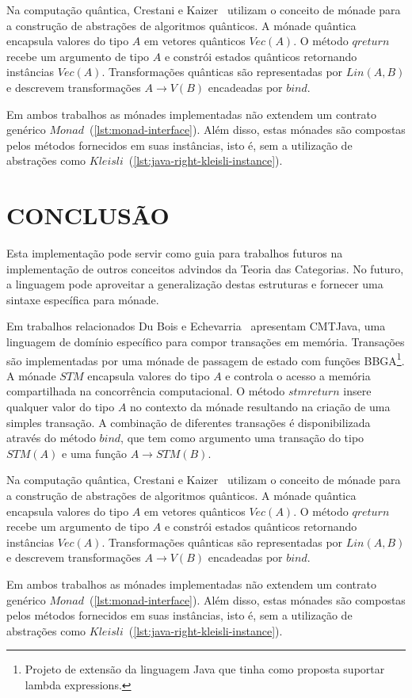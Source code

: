 \documentclass[10pt, conference]{IEEEtran}
\begin{document}
Na computação quântica, Crestani e Kaizer~\cite{crestani2013quantum} utilizam o conceito de mónade para a construção de abstrações de algoritmos quânticos. A mónade quântica encapsula valores do tipo $A$ em vetores quânticos $Vec(A)$. O método $qreturn$ recebe um argumento de tipo $A$ e constrói estados quânticos retornando instâncias $Vec(A)$. Transformações quânticas são representadas por $Lin(A, B)$ e descrevem transformações $A \rightarrow V(B)$ encadeadas por $bind$.

Em ambos trabalhos as mónades implementadas não extendem um contrato genérico $Monad$~(\ref{lst:monad-interface}). Além disso, estas mónades são compostas pelos métodos fornecidos em suas instâncias, isto é, sem a utilização de abstrações como $Kleisli$~(\ref{lst:java-right-kleisli-instance}).

\section{CONCLUSÃO}

Esta implementação pode servir como guia para trabalhos futuros na implementação de outros conceitos advindos da Teoria das Categorias. No futuro, a linguagem pode aproveitar a generalização destas estruturas e fornecer uma sintaxe específica para mónade.

Em trabalhos relacionados Du Bois e Echevarria~\cite{dubois2009domainspecific} apresentam CMTJava, uma linguagem de domínio específico para compor transações em memória. Transações são implementadas por uma mónade de passagem de estado com funções BBGA\footnote{Projeto de extensão da linguagem Java que tinha como proposta suportar lambda expressions.}. A mónade $STM$ encapsula valores do tipo $A$ e controla o acesso a memória compartilhada na concorrência computacional. O método $stmreturn$ insere qualquer valor do tipo $A$ no contexto da mónade resultando na criação de uma simples transação. A combinação de diferentes transações é disponibilizada através do método $bind$, que tem como argumento uma transação do tipo $STM(A)$ e uma função $A \rightarrow STM(B)$.

Na computação quântica, Crestani e Kaizer~\cite{crestani2013quantum} utilizam o conceito de mónade para a construção de abstrações de algoritmos quânticos. A mónade quântica encapsula valores do tipo $A$ em vetores quânticos $Vec(A)$. O método $qreturn$ recebe um argumento de tipo $A$ e constrói estados quânticos retornando instâncias $Vec(A)$. Transformações quânticas são representadas por $Lin(A, B)$ e descrevem transformações $A \rightarrow V(B)$ encadeadas por $bind$.

Em ambos trabalhos as mónades implementadas não extendem um contrato genérico $Monad$~(\ref{lst:monad-interface}). Além disso, estas mónades são compostas pelos métodos fornecidos em suas instâncias, isto é, sem a utilização de abstrações como $Kleisli$~(\ref{lst:java-right-kleisli-instance}).




\end{document}

